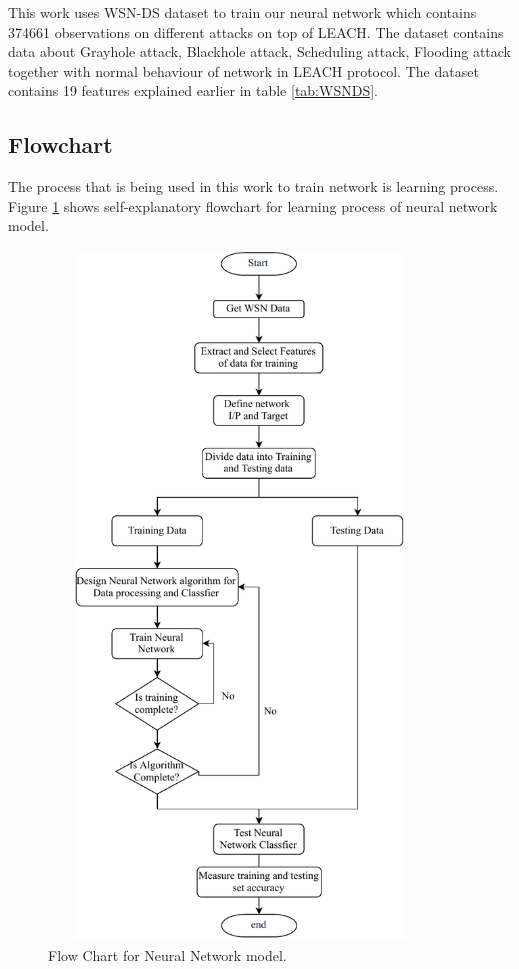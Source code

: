     \par This work uses WSN-DS dataset to train our neural network which contains 374661 observations on different attacks on top of LEACH. The dataset contains data about Grayhole attack, Blackhole attack, Scheduling attack, Flooding attack together with normal behaviour of network in LEACH protocol. The dataset contains 19 features explained earlier in table \ref{tab:WSNDS}.
    \subsection{Flowchart}
    The process that is being used in this work to train network is learning process. Figure \ref{FlowChart} shows self-explanatory flowchart for learning process of neural network model.
        \begin{figure}[hbp]
        \center	
        \includegraphics[width=4in, height=7.2in] {Figures/PDF/FlowChart.pdf}
        \caption{Flow Chart for Neural Network model.}
        \label{FlowChart}	
        \end{figure}

